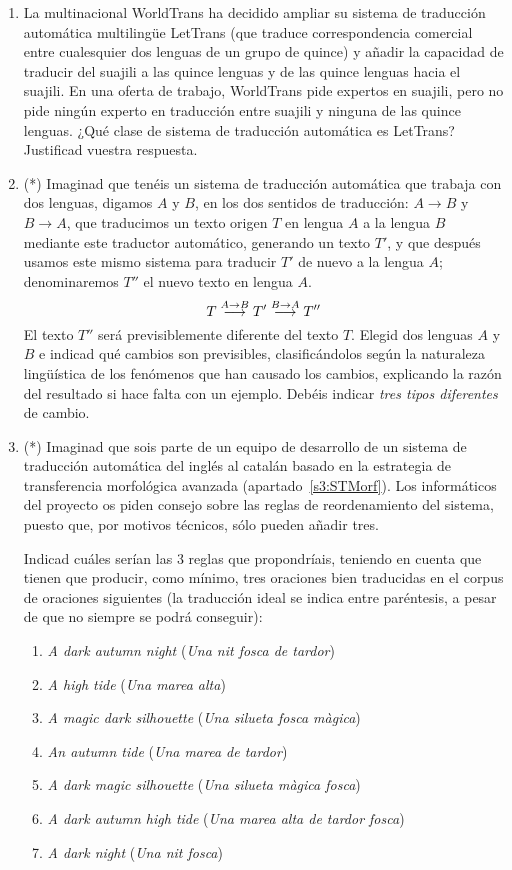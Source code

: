 \begin{enumerate}
\item La multinacional WorldTrans ha decidido ampliar su sistema de traducción automática multilingüe LetTrans (que traduce correspondencia comercial entre cualesquier dos lenguas de un grupo de quince) y añadir la capacidad de traducir del suajili a las quince lenguas y de las quince lenguas hacia el suajili. En una oferta de trabajo, WorldTrans pide expertos en suajili, pero no pide ningún experto en traducción entre suajili y ninguna de las quince lenguas. ¿Qué clase de sistema de traducción automática es LetTrans? Justificad vuestra respuesta. 

\item (*) Imaginad que tenéis un sistema de traducción automática que trabaja con dos lenguas, digamos $A$ y $B$, en los dos sentidos de traducción: $A{\rightarrow}B$ y $B{\rightarrow}A$, que traducimos un texto origen $T$ en lengua $A$ a la lengua $B$ mediante este traductor automático, generando un texto $T'$, y que después usamos este mismo sistema para traducir $T'$ de nuevo a la lengua $A$; denominaremos $T''$ el nuevo texto en lengua $A$. \begin{equation} T \stackrel{\scriptsize A\rightarrow B}{\longrightarrow}T'\stackrel{\scriptsize B\rightarrow A}{\longrightarrow} T'' \end{equation} El texto $T''$ será previsiblemente diferente del texto $T$. Elegid dos lenguas $A$ y $B$ e indicad qué cambios son previsibles, clasificándolos según la naturaleza lingüística de los fenómenos que han causado los cambios, explicando la razón del resultado si hace falta con un ejemplo. Debéis indicar \emph{tres tipos diferentes} de cambio. 

\item (*) Imaginad que sois parte de un equipo de desarrollo de un sistema de traducción automática del inglés al catalán basado en la estrategia de transferencia morfológica avanzada (apartado~\ref{s3:STMorf}). Los informáticos del proyecto os piden consejo sobre las reglas de reordenamiento del sistema, puesto que, por motivos técnicos, sólo pueden añadir tres. 

Indicad cuáles serían las 3 reglas que propondríais, teniendo en cuenta que tienen que producir, como mínimo, tres oraciones bien traducidas en el corpus de oraciones siguientes (la traducción ideal se indica entre paréntesis, a pesar de que no siempre se podrá conseguir): \begin{enumerate} \item \emph{A dark autumn night} (\emph{Una nit fosca de tardor}) \item \emph{A high tide} (\emph{Una marea alta}) \item \emph{A magic dark silhouette} (\emph{Una silueta fosca màgica}) \item \emph{An autumn tide} (\emph{Una marea de tardor}) \item \emph{A dark magic silhouette} (\emph{Una silueta màgica fosca}) \item \emph{A dark autumn high tide} (\emph{Una marea alta de tardor fosca}) \item \emph{A dark night} (\emph{Una nit fosca}) \end{enumerate} 


\end{enumerate}
